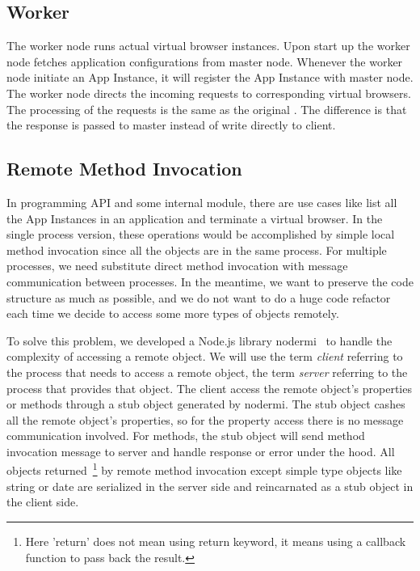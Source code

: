 \subsection{Worker}
The worker node runs actual virtual browser instances.
Upon start up the worker node fetches application configurations from master node.
Whenever the worker node initiate an App Instance, it will register the App Instance with master node.
The worker node directs the incoming requests to corresponding virtual browsers.
The processing of the requests is the same as the original \cb{}.
The difference is that the response is passed to master instead of write directly to client.


\subsection{Remote Method Invocation}
In \cb{} programming API and some internal module, there are use cases like list all the App Instances in an application 
and terminate a virtual browser.
In the single process version, these operations would be accomplished by simple local method invocation 
since all the objects are in the same process.
For multiple processes, 
we need substitute direct method invocation with message communication between processes.
In the meantime, we want to preserve the code structure as much as possible, 
and we do not want to do a huge code refactor each time we decide to access some more types of objects remotely.


To solve this problem, 
we developed a Node.js library nodermi~\cite{nodermi} to handle the complexity of accessing a remote object.
We will use the term \emph{client} referring to the process that needs to access a remote object, 
the term \emph{server} referring to the process that provides that object.
The client access the remote object's properties or methods through a stub object generated by nodermi.
The stub object cashes all the remote object's properties, 
so for the property access there is no message communication involved.
For methods,
the stub object will send method invocation message to server and handle response or error under the hood.
All objects returned~\footnote{Here 'return' does not mean using return keyword, it means using a callback function to pass back the result.} by remote method invocation
 except simple type objects like string or date are serialized in the server side
 and reincarnated as a stub object in the client side.

